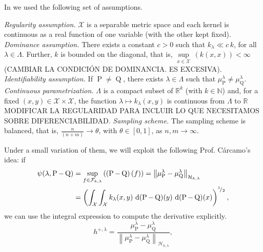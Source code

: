	In \textcite{Carcamo2024} we used the following set of assumptions.
	\begin{description}
		 \textit{Regularity assumption.} $\mathcal{X}$ is a separable metric space and each kernel is continuous as a real function of one variable (with the other kept fixed).
		 \textit{Dominance assumption.} There exists a constant $c>0$ such that $k_{\lambda}\ll c\,k$, for all $\lambda\in\Lambda$. Further, $k$ is bounded on the diagonal, that is, $\underset{x\in\mathcal{X}}{\operatorname{sup}}\,(k(x,x))<\infty$ {\color{orange}(CAMBIAR LA CONDICI\'{O}N DE DOMINANCIA. ES EXCESIVA)}.
		 \textit{Identifiability assumption.} If $\operatorname{P}\neq\operatorname{Q}$, there exists $\lambda\in\Lambda$ such that $\mu_{\operatorname{P}}^{\lambda}\neq\mu_{\operatorname{Q}}^{\lambda}$.
		 \textit{Continuous parametrization.} $\Lambda$ is a compact subset of $\mathbb{R}^{k}$ (with $k\in\mathbb{N}$) and, for a fixed $(x,y)\in\mathcal{X}\times\mathcal{X}$, the function $\lambda\mapsto k_{\lambda}(x,y)$ is continuous from $\Lambda$ to $\mathbb{R}$ {\color{orange} MODIFICAR LA REGULARIDAD PARA INCLUIR LO QUE NECESITAMOS SOBRE DIFERENCIABILIDAD}.
		 \textit{Sampling scheme.} The sampling scheme is balanced, that is, $\frac{n}{(n+m)}\to\theta$, with $\theta\in[0,1]$, as $n,m\to\infty$.
	\end{description}
	Under a small variation of them, we will exploit the following Prof. C\'{a}rcamo's idea: if
	\begin{equation}\label{Eqn:ProfCarcaIdea}
		\begin{aligned}
			\psi(\lambda,\operatorname{P}-\operatorname{Q})&=\underset{f\in\mathcal{F}_{k,\lambda}}{\operatorname{sup}}\,((\operatorname{P}-\operatorname{Q})\,(f))=\left\|\mu_{\operatorname{P}}^{\lambda}-\mu_{\operatorname{Q}}^{\lambda}\right\|_{\mathcal{H}_{k,\lambda}}
			\\&=\left(\int_{\mathcal{X}}\int_{\mathcal{X}}k_{\lambda}(x,y)\,\operatorname{d}(\operatorname{P}-\operatorname{Q})(y)\,\operatorname{d}(\operatorname{P}-\operatorname{Q})(x)\right)^{^{1}\!/_{2}},
		\end{aligned}
	\end{equation}
	we can use the integral expression to compute the derivative explicitly.
	\begin{equation}\label{Eqn:Witness}
		h^{+,\lambda}=\frac{\mu_{\operatorname{P}}^{\lambda}-\mu_{\operatorname{Q}}^{\lambda}}{\left\|\mu_{\operatorname{P}}^{\lambda}-\mu_{\operatorname{Q}}^{\lambda}\right\|_{\mathcal{H}_{k,\lambda}}},
	\end{equation}
	
